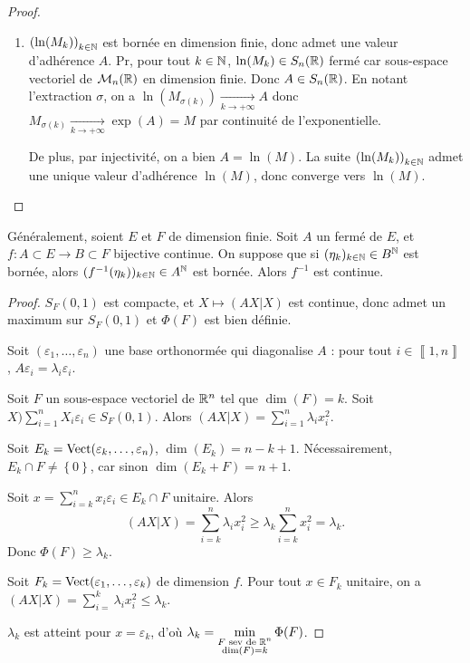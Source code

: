 \documentclass[12pt]{article}
\begin{document}
\begin{proof}
\begin{enumerate}
		\item $\left(\ln(M_k)\right)_{k\in\mathbb{N}}$ est bornée en dimension finie, donc admet une valeur d'adhérence $A$. Pr, pour tout $k\in\mathbb{N}$, $\ln(M_k)\in S_n(\mathbb{R})$ fermé car sous-espace vectoriel de $\mathcal{M}_n(\mathbb{R})$ en dimension finie. Donc $A\in S_n(\mathbb{R})$. En notant l'extraction $\sigma$, on a $\ln\left(M_{\sigma(k)}\right)\xrightarrow[k\to+\infty]{}A$ donc $M_{\sigma(k)}\xrightarrow[k\to+\infty]{}\exp(A)=M$ par continuité de l'exponentielle.
		
		De plus, par injectivité, on a bien $A=\ln(M)$. La suite $\left(\ln(M_k)\right)_{k\in\mathbb{N}}$ admet une unique valeur d'adhérence $\ln(M)$, donc converge vers $\ln(M)$.
	\end{enumerate}
\end{proof}

\begin{remark}
	Généralement, soient $E$ et $F$ de dimension finie. Soit $A$ un fermé de $E$, et $f\colon A\subset E\to B\subset F$ bijective continue. On suppose que si $(\eta_k)_{k\in\mathbb{N}}\in B^{\mathbb{N}}$ est bornée, alors $(f^{-1}(\eta_k))_{k\in\mathbb{N}}\in A^{\mathbb{N}}$ est bornée. Alors $f^{-1}$ est continue.
\end{remark}

\begin{proof}
	$S_F(0,1)$ est compacte, et $X\mapsto(AX|X)$ est continue, donc admet un maximum sur $S_F(0,1)$ et $\Phi(F)$ est bien définie. 

	Soit $(\varepsilon_{1},\dots,\varepsilon_{n})$ une base orthonormée qui diagonalise $A$ : pour tout $i\in\left\llbracket 1,n\right\rrbracket$, $A\varepsilon_{i}=\lambda_i\varepsilon_{i}$.

	Soit $F$ un sous-espace vectoriel de $\mathbb{R}^{n}$ tel que $\dim(F)=k$. Soit $X)\sum_{i=1}^{n}X_i\varepsilon_{i}\in S_F(0,1)$. Alors $(AX|X)=\sum_{i=1}^{n}\lambda_i x_i^{2}$.

	Soit $E_k=\operatorname{Vect}(\varepsilon_k,\dots,\varepsilon_{n})$, $\dim(E_k)=n-k+1$. Nécessairement, $E_k\cap F\neq\left\lbrace0\right\rbrace$, car sinon $\dim(E_k+F)=n+1$. 

	Soit $x=\sum_{i=k}^{n}x_i\varepsilon_i\in E_k\cap F$ unitaire. Alors 
	\begin{equation}
		(AX|X)=\sum_{i=k}^{n}\lambda_i x_i^{2}\geqslant \lambda_k\sum_{i=k}^{n}x_i^{2}=\lambda_k.
	\end{equation}
	Donc $\Phi(F)\geqslant \lambda_k$.

	Soit $F_k=\operatorname{Vect}(\varepsilon_1,\dots,\varepsilon_k)$ de dimension $f$. Pour tout $x\in F_k$ unitaire, on a $(AX|X)=\sum_{i=}^{k}\lambda_i x_i^{2}\leqslant \lambda_k$.

	$\lambda_k$ est atteint pour $x=\varepsilon_k$, d'où $\lambda_k=\min\limits_{\substack{F\text{ sev de }\mathbb{R}^{n}\\ \dim(F)=k}}\Phi(F)$.
\end{proof}
\end{document}
